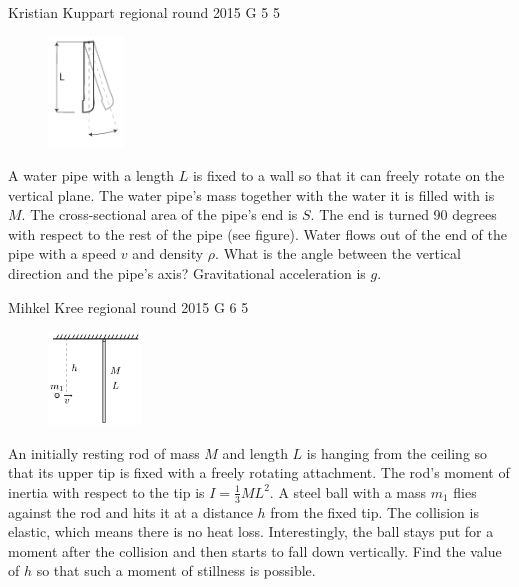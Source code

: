 \documentclass[11pt]{article}
\begin{document}
{Kristian Kuppart} %
{regional round} %
{2015} %
{G 5} %
{5} %
{

\ifEngStatement
\begin{figure}
  \vspace{-35pt}
  \begin{center}
    \includegraphics[width=0.18\textwidth]{2015-v2g-05-toru}
  \end{center}
  \vspace*{-10pt}
\end{figure}
A water pipe with a length $L$ is fixed to a wall so that it can freely rotate on the vertical plane. The water pipe’s mass together with the water it is filled with is $M$. The cross-sectional area of the pipe’s end is $S$. The end is turned 90 degrees with respect to the rest of the pipe (see figure). Water flows out of the end of the pipe with a speed $v$ and density $\rho$. What is the angle between the vertical direction and the pipe’s axis? Gravitational acceleration is $g$.
\fi
}

{Mihkel Kree} %
{regional round} %
{2015} %
{G 6} %
{5} %
{

\ifEngStatement
\begin{figure}
\includegraphics[width=0.22\textwidth]{2015-v2g-06-porgejoonis}
\end{figure}
An initially resting rod of mass $M$ and length $L$ is hanging from the ceiling so that its upper tip is fixed with a freely rotating attachment. The rod’s moment of inertia with respect to the tip is $I=\frac{1}{3}ML^2$. A steel ball with a mass $m_1$ flies against the rod and hits it at a distance $h$ from the fixed tip. The collision is elastic, which means there is no heat loss. Interestingly, the ball stays put for a moment after the collision and then starts to fall down vertically. Find the value of $h$ so that such a moment of stillness is possible.
\fi
}
\end{document}
